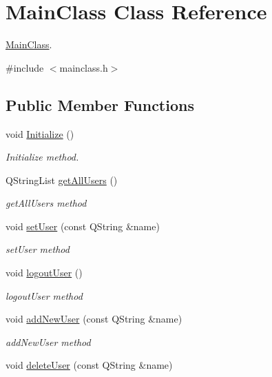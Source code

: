 \hypertarget{class_main_class}{}\section{Main\+Class Class Reference}
\label{class_main_class}


\hyperlink{class_main_class}{Main\+Class}.  




{\ttfamily \#include $<$mainclass.\+h$>$}

\subsection*{Public Member Functions}
\begin{DoxyCompactItemize}
\item 
void \hyperlink{class_main_class_a91e4a76fcf2576ccf592373e4786fc42}{Initialize} ()
\begin{DoxyCompactList}\small\item\em Initialize method. \end{DoxyCompactList}\item 
Q\+String\+List \hyperlink{class_main_class_a4b7b9aa5957f262b49b77b2c75eca17b}{get\+All\+Users} ()
\begin{DoxyCompactList}\small\item\em get\+All\+Users method \end{DoxyCompactList}\item 
void \hyperlink{class_main_class_aca60a0309924003da0af912365810ea3}{set\+User} (const Q\+String \&name)
\begin{DoxyCompactList}\small\item\em set\+User method \end{DoxyCompactList}\item 
void \hyperlink{class_main_class_ad3beecfb06b5105b79a9dd53dc620811}{logout\+User} ()
\begin{DoxyCompactList}\small\item\em logout\+User method \end{DoxyCompactList}\item 
void \hyperlink{class_main_class_a23203055dd5db7147ba38531ab3814b3}{add\+New\+User} (const Q\+String \&name)
\begin{DoxyCompactList}\small\item\em add\+New\+User method \end{DoxyCompactList}\item 
void \hyperlink{class_main_class_a2d2f031f2e6094ff22e2304479a5485d}{delete\+User} (const Q\+String \&name)

\end{DoxyCompactItemize}
